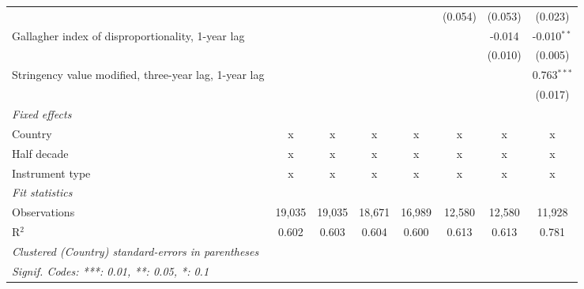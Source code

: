 \begin{table}[htbp]
\begin{tabular}{lccccccc}
                                                            &              &         &              &               & (0.054)       & (0.053)       & (0.023)\\   
      Gallagher index of disproportionality, 1-year lag     &              &         &              &               &               & -0.014        & -0.010$^{**}$\\   
                                                            &              &         &              &               &               & (0.010)       & (0.005)\\   
      Stringency value modified, three-year lag, 1-year lag &              &         &              &               &               &               & 0.763$^{***}$\\   
                                                            &              &         &              &               &               &               & (0.017)\\   
      \emph{Fixed effects}\\
      Country                                               & x            & x       & x            & x             & x             & x             & x\\  
      Half decade                                           & x            & x       & x            & x             & x             & x             & x\\  
      Instrument type                                       & x            & x       & x            & x             & x             & x             & x\\  
      \midrule \emph{Fit statistics}\\
      Observations                                          & 19,035       & 19,035  & 18,671       & 16,989        & 12,580        & 12,580        & 11,928\\  
      R$^2$                                                 & 0.602        & 0.603   & 0.604        & 0.600         & 0.613         & 0.613         & 0.781\\  
      \midrule
      \multicolumn{8}{l}{\emph{Clustered (Country) standard-errors in parentheses}}\\
      \multicolumn{8}{l}{\emph{Signif. Codes: ***: 0.01, **: 0.05, *: 0.1}}\\
   \end{tabular}
\end{table}


